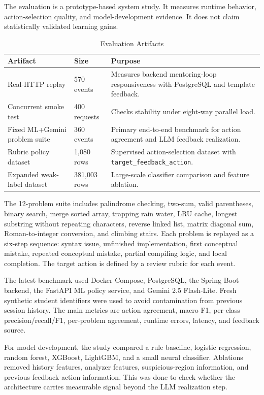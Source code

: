 \documentclass[conference]{IEEEtran}
\begin{document}
The evaluation is a prototype-based system study. It measures runtime behavior, action-selection quality, and model-development evidence. It does not claim statistically validated learning gains.

\begin{table}[t]
\centering
\caption{Evaluation Artifacts}
\label{tab:artifacts}
\renewcommand{\arraystretch}{1.15}
\begin{tabular}{p{3.3cm} p{2.3cm} p{9.0cm}}
\toprule
\textbf{Artifact} & \textbf{Size} & \textbf{Purpose} \\
\midrule
Real-HTTP replay & 570 events & Measures backend mentoring-loop responsiveness with PostgreSQL and template feedback. \\
Concurrent smoke test & 400 requests & Checks stability under eight-way parallel load. \\
Fixed ML+Gemini problem suite & 360 events & Primary end-to-end benchmark for action agreement and LLM feedback realization. \\
Rubric policy dataset & 1,080 rows & Supervised action-selection dataset with \texttt{target\_feedback\_action}. \\
Expanded weak-label dataset & 381,003 rows & Large-scale classifier comparison and feature ablation. \\
\bottomrule
\end{tabular}
\end{table}

The 12-problem suite includes palindrome checking, two-sum, valid parentheses, binary search, merge sorted array, trapping rain water, LRU cache, longest substring without repeating characters, reverse linked list, matrix diagonal sum, Roman-to-integer conversion, and climbing stairs. Each problem is replayed as a six-step sequence: syntax issue, unfinished implementation, first conceptual mistake, repeated conceptual mistake, partial compiling logic, and local completion. The target action is defined by a review rubric for each event.

The latest benchmark used Docker Compose, PostgreSQL, the Spring Boot backend, the FastAPI ML policy service, and Gemini 2.5 Flash-Lite. Fresh synthetic student identifiers were used to avoid contamination from previous session history. The main metrics are action agreement, macro F1, per-class precision/recall/F1, per-problem agreement, runtime errors, latency, and feedback source.

For model development, the study compared a rule baseline, logistic regression, random forest, XGBoost, LightGBM, and a small neural classifier. Ablations removed history features, analyzer features, suspicious-region information, and previous-feedback-action information. This was done to check whether the architecture carries measurable signal beyond the LLM realization step.
\end{document}
